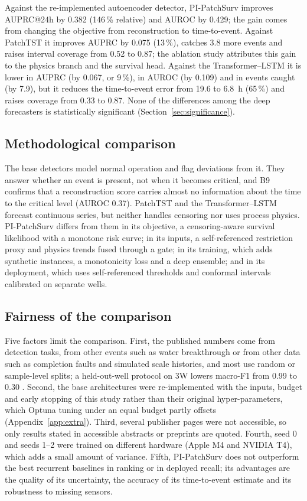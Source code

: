 Against the re-implemented autoencoder detector, PI-PatchSurv improves AUPRC@24h by 0.382 (146\,\% relative)
and AUROC by 0.429; the gain comes from changing the objective from reconstruction to time-to-event.
Against PatchTST it improves AUPRC by 0.075 (13\,\%), catches 3.8 more events and raises interval coverage
from 0.52 to 0.87; the ablation study attributes this gain to the physics branch and the survival head.
Against the Transformer--LSTM it is lower in AUPRC (by 0.067, or 9\,\%), in AUROC (by 0.109) and in events
caught (by 7.9), but it reduces the time-to-event error from 19.6 to 6.8~h (65\,\%) and raises coverage from
0.33 to 0.87. None of the differences among the deep forecasters is statistically significant
(Section~\ref{sec:significance}).

\subsection{Methodological comparison}

The base detectors model normal operation and flag deviations from it. They answer whether an event is
present, not when it becomes critical, and B9 confirms that a reconstruction score carries almost no
information about the time to the critical level (AUROC 0.37). PatchTST and the Transformer--LSTM forecast
continuous series, but neither handles censoring nor uses process physics. PI-PatchSurv differs from them
in its objective, a censoring-aware survival likelihood with a monotone risk curve; in its inputs, a
self-referenced restriction proxy and physics trends fused through a gate; in its training, which adds
synthetic instances, a monotonicity loss and a deep ensemble; and in its deployment, which uses
self-referenced thresholds and conformal intervals calibrated on separate wells.

\subsection{Fairness of the comparison}

Five factors limit the comparison. First, the published numbers come from detection tasks, from other events
such as water breakthrough or from other data such as completion faults and simulated scale histories, and
most use random or sample-level splits; a held-out-well protocol on 3W lowers macro-F1 from 0.99 to 0.30
\citep{issue231}. Second, the base architectures were re-implemented with the inputs, budget and early
stopping of this study rather than their original hyper-parameters, which Optuna tuning under an equal
budget partly offsets (Appendix~\ref{app:extra}). Third, several publisher pages were not accessible, so only
results stated in accessible abstracts or preprints are quoted. Fourth, seed 0 and seeds 1--2 were trained
on different hardware (Apple M4 and NVIDIA T4), which adds a small amount of variance. Fifth, PI-PatchSurv
does not outperform the best recurrent baselines in ranking or in deployed recall; its advantages are the
quality of its uncertainty, the accuracy of its time-to-event estimate and its robustness to missing sensors.
